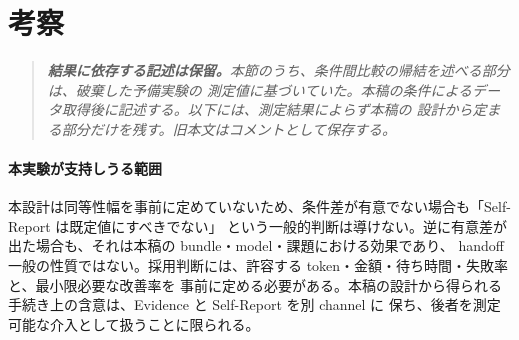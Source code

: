 \documentclass[conference,letterpaper]{IEEEtran}
\begin{document}


\section{考察}

\begin{quote}\itshape
\textbf{結果に依存する記述は保留。}本節のうち、条件間比較の帰結を述べる部分は、破棄した予備実験の
測定値に基づいていた。本稿の条件によるデータ取得後に記述する。以下には、測定結果によらず本稿の
設計から定まる部分だけを残す。旧本文はコメントとして保存する。
\end{quote}

\paragraph{本実験が支持しうる範囲}
本設計は同等性幅を事前に定めていないため、条件差が有意でない場合も「Self-Report は既定値にすべきでない」
という一般的判断は導けない。逆に有意差が出た場合も、それは本稿の bundle・model・課題における効果であり、
handoff 一般の性質ではない。採用判断には、許容する token・金額・待ち時間・失敗率と、最小限必要な改善率を
事前に定める必要がある。本稿の設計から得られる手続き上の含意は、Evidence と Self-Report を別 channel に
保ち、後者を測定可能な介入として扱うことに限られる。
\end{document}
